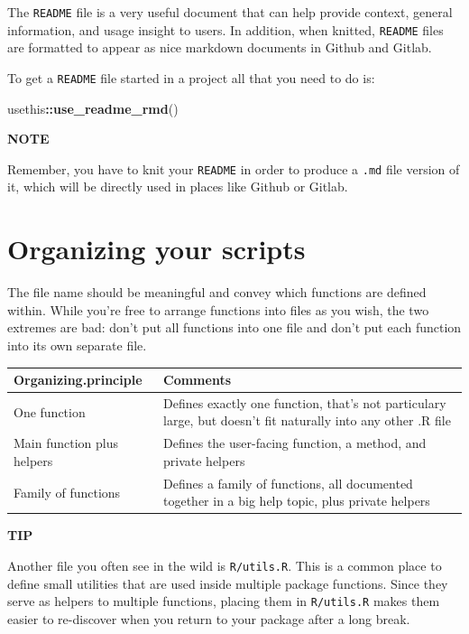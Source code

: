\documentclass[
]{book}
\newenvironment{Shaded}{\begin{snugshade}}{\end{snugshade}}
\newcommand{\KeywordTok}[1]{\textcolor[rgb]{0.13,0.29,0.53}{\textbf{#1}}}
\newcommand{\NormalTok}[1]{#1}
\newcommand{\OperatorTok}[1]{\textcolor[rgb]{0.81,0.36,0.00}{\textbf{#1}}}
\begin{document}
The \texttt{README} file is a very useful document that can help provide context, general information, and usage insight to users. In addition, when knitted, \texttt{README} files are formatted to appear as nice markdown documents in Github and Gitlab.

To get a \texttt{README} file started in a project all that you need to do is:

\begin{Shaded}
\begin{Highlighting}[]
\NormalTok{usethis}\OperatorTok{::}\KeywordTok{use_readme_rmd}\NormalTok{() }
\end{Highlighting}
\end{Shaded}

\textbf{NOTE}

Remember, you have to knit your \texttt{README} in order to produce a \texttt{.md} file version of it, which will be directly used in places like Github or Gitlab.

\hypertarget{organizing-your-scripts}{%
\section{Organizing your scripts}\label{organizing-your-scripts}}

The file name should be meaningful and convey which functions are defined within. While you're free to arrange functions into files as you wish, the two extremes are bad: don't put all functions into one file and don't put each function into its own separate file.

\begin{tabular}{l|l}
\hline
Organizing.principle & Comments\\
\hline
One function & Defines exactly one function, that’s not particulary large, but doesn’t fit naturally into any other .R file\\
\hline
Main function plus helpers & Defines the user-facing function, a method, and private helpers\\
\hline
Family of functions & Defines a family of functions, all documented together in a big help topic, plus private helpers\\
\hline
\end{tabular}

\textbf{TIP}

Another file you often see in the wild is \texttt{R/utils.R}.
This is a common place to define small utilities that are used inside multiple package functions.
Since they serve as helpers to multiple functions, placing them in \texttt{R/utils.R} makes them easier to re-discover when you return to your package after a long break.
\end{document}
